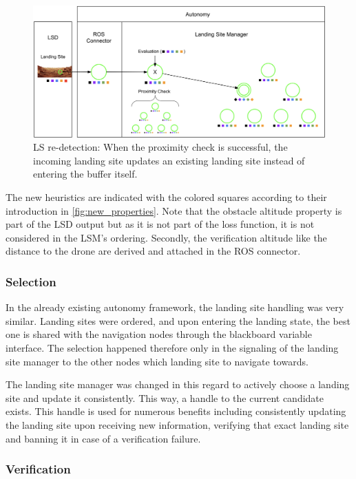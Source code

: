 \begin{figure}[h]
\centering
\includegraphics[scale=0.16]{images/autonomous_landing/re-detection.png}
\caption{LS re-detection: When the proximity check is successful, the incoming landing site updates an existing landing site instead of entering the buffer itself.}
\label{fig:ls_redetection}
\end{figure}

The new heuristics are indicated with the colored squares according to their introduction in \cref{fig:new_properties}. Note that the obstacle altitude property is part of the LSD output but as it is not part of the loss function, it is not considered in the LSM's ordering. Secondly, the verification altitude like the distance to the drone are derived and attached in the ROS connector.

\subsubsection{Selection}

In the already existing autonomy framework, the landing site handling was very similar. Landing sites were ordered, and upon entering the landing state, the best one is shared with the navigation nodes through the blackboard variable interface. The selection happened therefore only in the signaling of the landing site manager to the other nodes which landing site to navigate towards.

The landing site manager was changed in this regard to actively choose a landing site and update it consistently. This way, a handle to the current candidate exists. This handle is used for numerous benefits including consistently updating the landing site upon receiving new information, verifying that exact landing site and banning it in case of a verification failure. 

\subsubsection{Verification}\label{subsubsec:verification}

